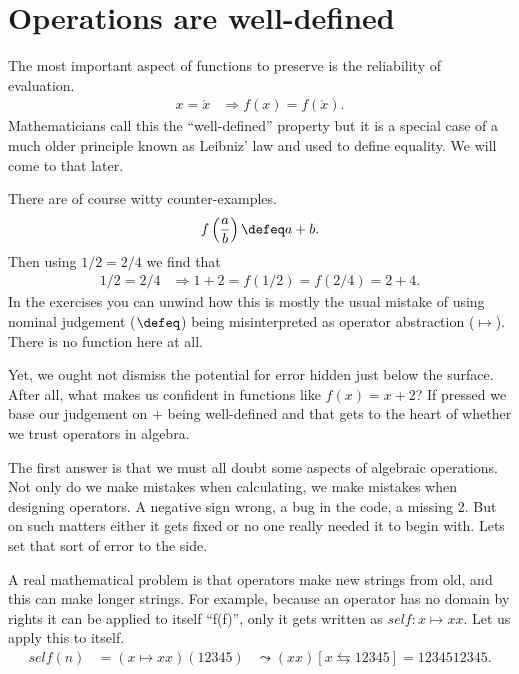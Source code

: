 
\section{Operations are well-defined}
The most important aspect of functions to preserve is the reliability of evaluation.
\begin{align*}
    \tag{Well-defined}
    x=\acute{x} & \Rightarrow f(x)=f(\acute{x}).
\end{align*}
Mathematicians call this the ``well-defined'' property but it 
is a special case of a much older principle known as Leibniz' law 
and used to define equality.  We will come to that later.

There are of course witty counter-examples.
\begin{align*}
    f\left(\frac{a}{b}\right)\defeq a+b.
\end{align*}
Then using $1/2=2/4$ we find that
\begin{align*}
    1/2 = 2/4 & \Rightarrow 1+2=f(1/2)=f(2/4)=2+4.
\end{align*}
In the exercises you can unwind how this is mostly the 
usual mistake of using nominal judgement ($\defeq$) 
being misinterpreted as operator abstraction ($\mapsto$).
There is no function here at all.

Yet, we ought not dismiss the potential for error hidden 
just below the surface.  After all, what makes us 
confident in functions like $f(x)=x+2$?  If pressed we 
base our judgement on $+$ being well-defined and that 
gets to the heart of whether we trust operators in algebra.

The first answer is that we must all doubt some aspects 
of algebraic operations.  Not only do we make mistakes when 
calculating, we make mistakes when designing operators.  
A negative sign wrong, a bug in the code, a missing 2.  
But on such matters either it gets fixed or no one really needed 
it to begin with.  Lets set that sort of error to the side.

A real mathematical problem is that operators make new strings 
from old, and this can make longer strings.  For example, 
because an operator has no domain by rights it can be applied to 
itself ``f(f)'', only it gets written as $self:x\mapsto xx$.  Let us 
apply this to itself.
\begin{align*}
    self(n) & = (x\mapsto xx)(12345) & \leadsto (xx)[x\leftrightarrows 12345] = 1234512345.\\
\end{align*}

